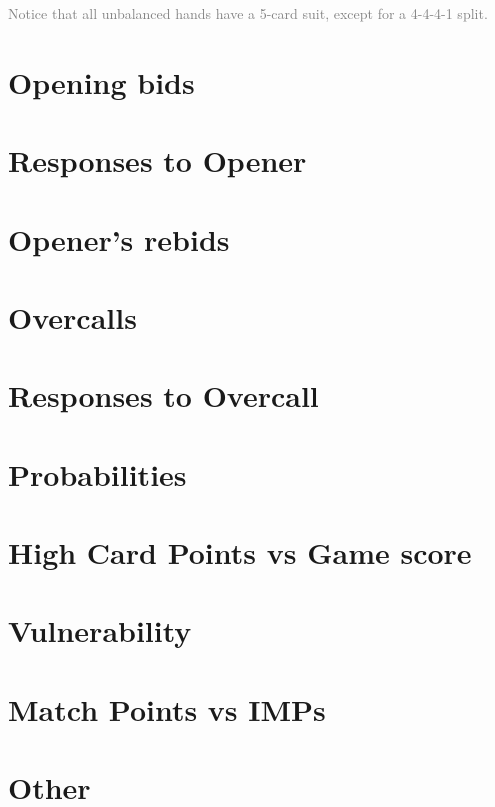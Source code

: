 \documentclass{article}
\newcommand{\note}[1]{\textcolor{gray}{#1}}
\begin{document}
\note{Notice that all unbalanced hands have a 5-card suit, except for a 4-4-4-1 split.}

\section{Opening bids}
\section{Responses to Opener}
\section{Opener's rebids}

\section{Overcalls}
\section{Responses to Overcall}

\section{Probabilities}
\section{High Card Points vs Game score}
\section{Vulnerability}
\section{Match Points vs IMPs}
\section{Other}
\end{document}
